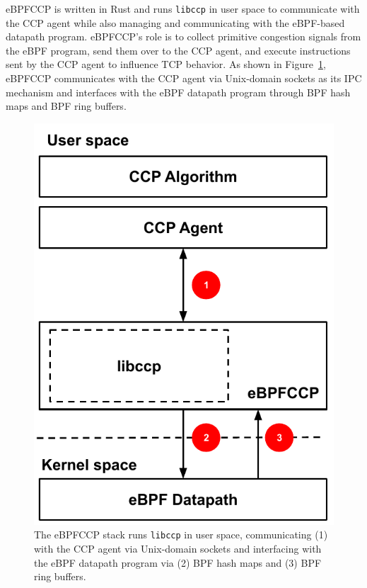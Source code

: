 \documentclass[../main.tex]{subfiles}
\begin{document}
eBPFCCP is written in Rust and runs \texttt{libccp} in user space to communicate with the CCP agent while also managing and communicating with the eBPF-based datapath program.
eBPFCCP's role is to collect primitive congestion signals from the eBPF program, send them over to the CCP agent, and execute instructions sent by the CCP agent to influence TCP behavior.
As shown in Figure~\ref{fig:ebpfccp}, eBPFCCP communicates with the CCP agent via Unix-domain sockets as its IPC mechanism and interfaces with the eBPF datapath program through BPF hash maps and BPF ring buffers.

\begin{figure}[t]
\centering
    \includegraphics[width=\columnwidth]{img/ebpfccp}
    \caption{The eBPFCCP stack runs \texttt{libccp} in user space, communicating (1) with the CCP agent via Unix-domain sockets and interfacing with the eBPF datapath program via (2) BPF hash maps and (3) BPF ring buffers.
    }\label{fig:ebpfccp}
\end{figure}
\end{document}
